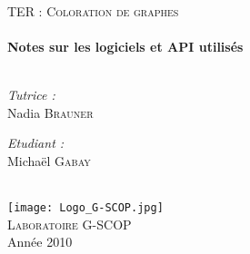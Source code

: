 \begin{titlepage}
\begin{center}

\quad \\[2cm]
 
\textsc{\Large TER : Coloration de graphes}\\[0.5cm]

\HRule \\[0.5cm]
{ \huge \bfseries Notes sur les logiciels et API utilisés}\\[0.4cm]  %
 
\HRule \\[1.5cm]

\begin{minipage}{0.4\textwidth}
\begin{flushleft} \large
\emph{Tutrice :}\\
Nadia \textsc{Brauner}
\end{flushleft}
\end{minipage}
\begin{minipage}{0.4\textwidth}
\begin{flushright} \large
\emph{Etudiant :} \\

Michaël \textsc{Gabay}\\
\end{flushright}
\end{minipage}


\quad \\[1.5cm]

\texttt{[image: Logo\_G-SCOP.jpg]} \\[1.5cm]

\textsc{\LARGE Laboratoire G-SCOP}\\[1.5cm]

\vfill 
{\large Année 2010}

\end{center} 
\end{titlepage}